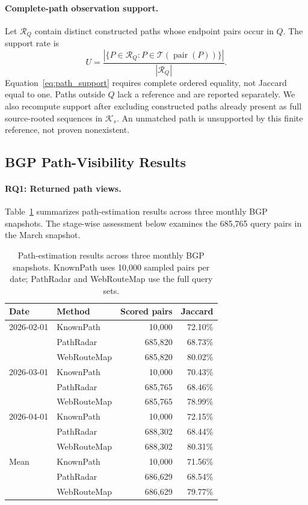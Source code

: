 \documentclass[sigconf,anonymous,review]{acmart}
\newcommand{\sys}{\mbox{WebRouteMap}\xspace}
\begin{document}
\paragraph{Complete-path observation support.}
Let $\mathcal R_Q$ contain distinct constructed paths whose endpoint pairs
occur in $Q$. The support rate is
\begin{equation}
U=\frac{|\{P\in\mathcal R_Q:P\in\mathcal T(\operatorname{pair}(P))\}|}
{|\mathcal R_Q|}.
\label{eq:path_support}
\end{equation}
Equation~\eqref{eq:path_support} requires complete ordered equality,
not Jaccard equal to one. Paths outside $Q$ lack a reference and are reported
separately. We also recompute support after excluding constructed paths
already present as full source-rooted sequences in $\mathcal K_s$.
An unmatched path is unsupported by this finite reference, not proven
nonexistent.

\subsection{BGP Path-Visibility Results}

\paragraph{RQ1: Returned path views.}
Table~\ref{tab:bgp_results} summarizes path-estimation results across three
monthly BGP snapshots. The stage-wise assessment below examines the
685,765 query pairs in the March snapshot.

\begin{table}[t]
\centering
\caption{Path-estimation results across three monthly BGP snapshots.
KnownPath uses 10,000 sampled pairs per date; PathRadar and \sys use
the full query sets.}
\label{tab:bgp_results}
\footnotesize
\setlength{\tabcolsep}{2pt}
\begin{tabular*}{\columnwidth}{@{\extracolsep{\fill}}llrr@{}}
\toprule
Date & Method & Scored pairs & Jaccard\\
\midrule
2026-02-01 & KnownPath & 10,000 & 72.10\%\\
 & PathRadar & 685,820 & 68.73\%\\
 & \sys & 685,820 & 80.02\%\\
\midrule
2026-03-01 & KnownPath & 10,000 & 70.43\%\\
 & PathRadar & 685,765 & 68.46\%\\
 & \sys & 685,765 & 78.99\%\\
\midrule
2026-04-01 & KnownPath & 10,000 & 72.15\%\\
 & PathRadar & 688,302 & 68.44\%\\
 & \sys & 688,302 & 80.31\%\\
\midrule
Mean & KnownPath & 10,000 & 71.56\%\\
 & PathRadar & 686,629 & 68.54\%\\
 & \sys & 686,629 & 79.77\%\\
\bottomrule
\end{tabular*}
\end{table}
\end{document}
